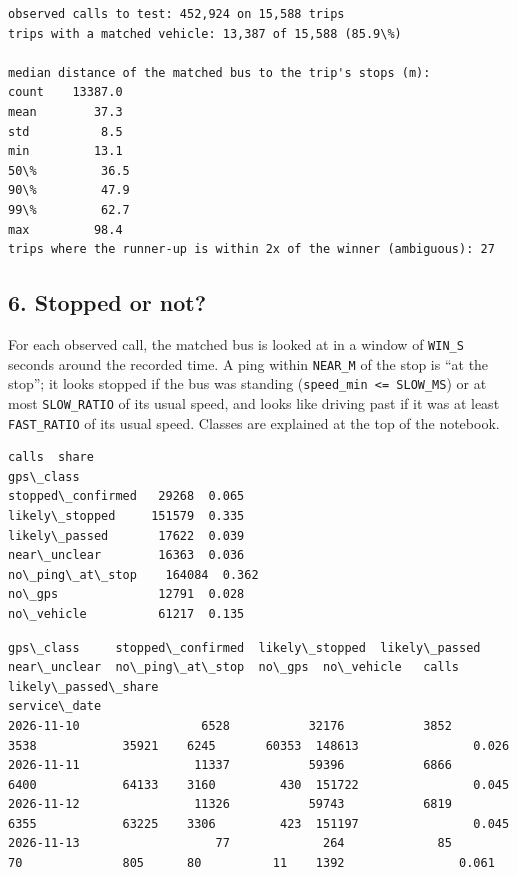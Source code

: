 \documentclass[11pt]{article}
\begin{document}
    \begin{Verbatim}[commandchars=\\\{\}]
observed calls to test: 452,924 on 15,588 trips
trips with a matched vehicle: 13,387 of 15,588 (85.9\%)

median distance of the matched bus to the trip's stops (m):
count    13387.0
mean        37.3
std          8.5
min         13.1
50\%         36.5
90\%         47.9
99\%         62.7
max         98.4
trips where the runner-up is within 2x of the winner (ambiguous): 27
    \end{Verbatim}

    \subsection{6. Stopped or not?}\label{stopped-or-not}

For each observed call, the matched bus is looked at in a window of
\texttt{WIN\_S} seconds around the recorded time. A ping within
\texttt{NEAR\_M} of the stop is ``at the stop''; it looks stopped if the
bus was standing (\texttt{speed\_min\ \textless{}=\ SLOW\_MS}) or at
most \texttt{SLOW\_RATIO} of its usual speed, and looks like driving
past if it was at least \texttt{FAST\_RATIO} of its usual speed. Classes
are explained at the top of the notebook.

    
    \begin{Verbatim}[commandchars=\\\{\}]
                    calls  share
gps\_class                       
stopped\_confirmed   29268  0.065
likely\_stopped     151579  0.335
likely\_passed       17622  0.039
near\_unclear        16363  0.036
no\_ping\_at\_stop    164084  0.362
no\_gps              12791  0.028
no\_vehicle          61217  0.135
    \end{Verbatim}

    
    
    \begin{Verbatim}[commandchars=\\\{\}]
gps\_class     stopped\_confirmed  likely\_stopped  likely\_passed  near\_unclear  no\_ping\_at\_stop  no\_gps  no\_vehicle   calls  likely\_passed\_share
service\_date                                                                                                                                  
2026-11-10                 6528           32176           3852          3538            35921    6245       60353  148613                0.026
2026-11-11                11337           59396           6866          6400            64133    3160         430  151722                0.045
2026-11-12                11326           59743           6819          6355            63225    3306         423  151197                0.045
2026-11-13                   77             264             85            70              805      80          11    1392                0.061
    \end{Verbatim}
\end{document}
